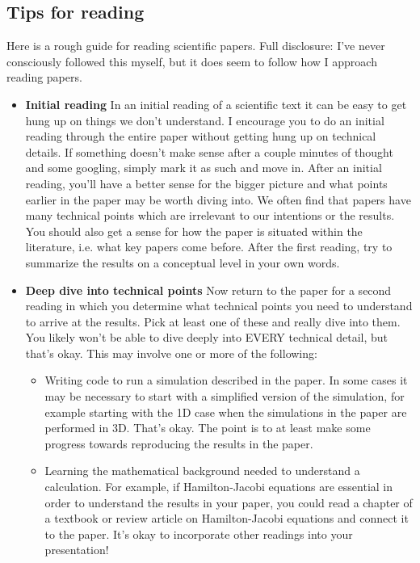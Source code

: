 \documentclass{amsart}
\begin{document}
\subsection{Tips for reading}

Here is a rough guide for reading scientific papers. Full disclosure: I've never consciously followed this myself, but it does seem to follow how I approach reading papers. 

\begin{itemize}
\item {\bf Initial reading} In an initial reading of a scientific text it can be easy to get hung up on things we don't understand. I encourage you to do an initial reading through the entire paper without getting hung up on technical details. If something doesn't make sense after a couple minutes of thought and some googling, simply mark it as such and move in. After an initial reading, you'll have a better sense for the bigger picture and what points earlier in the paper may be worth diving into. We often find that papers have many technical points which are irrelevant to our intentions or the results. You should also get a sense for how the paper is situated within the literature, i.e. what key papers come before. 
After the first reading, try to summarize the results on a conceptual level in your own words.
\item{\bf Deep dive into technical points} Now return to the paper for a second reading in which you determine what technical points you need to understand to arrive at the results. Pick at least one of these and really dive into them. You likely won't be able to dive deeply into EVERY technical detail, but that's okay. This may involve one or more of the following:
\begin{itemize}
\item  Writing code to run a simulation described in the paper. In some cases it may be necessary to start with a simplified version of the simulation, for example starting with the 1D case when the simulations in the paper are performed in 3D. That's okay. The point is to at least make some progress towards reproducing the results in the paper. 
\item  Learning the mathematical background needed to understand a calculation. For example, if Hamilton-Jacobi equations are essential in order to understand the results in your paper, you could read a chapter of a textbook or review article on Hamilton-Jacobi equations and connect it to the paper. It's okay to incorporate other readings into your presentation! 

\end{itemize}
\end{itemize}
\end{document}
